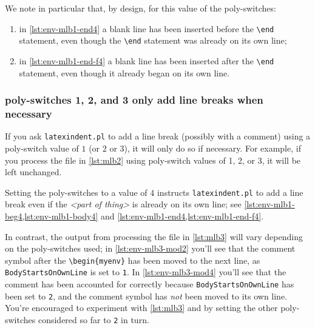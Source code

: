	We note in particular that, by design, for this value of the poly-switches:
	\begin{enumerate}
		\item in \cref{lst:env-mlb1-end4} a blank line has been inserted before the
		      \lstinline!\end! statement, even though the \lstinline!\end!
		      statement was already on its own line;
		\item in \cref{lst:env-mlb1-end-f4} a blank line has been inserted after the
		      \lstinline!\end! statement, even though it already began on its own line.
	\end{enumerate}

\subsubsection{poly-switches 1, 2, and 3 only add line breaks when necessary}
	If you ask \texttt{latexindent.pl} to add a line break (possibly with a comment)
	using a poly-switch value of $1$ (or $2$
	or $3$), it will only do so if necessary. For example, if you
	process the file in \vref{lst:mlb2} using poly-switch values of 1, 2, or 3,
	it will be left unchanged.

	\begin{minipage}{.45\linewidth}
	\end{minipage}
	\hfill
	\begin{minipage}{.45\linewidth}
	\end{minipage}

	Setting the poly-switches to a value of $4$ instructs
	\texttt{latexindent.pl} to add a line break even if the \emph{<part of thing>}
	is already on its own line; see \cref{lst:env-mlb1-beg4,lst:env-mlb1-body4} and
	\cref{lst:env-mlb1-end4,lst:env-mlb1-end-f4}.

	In contrast, the output from processing the file in \cref{lst:mlb3} will
	vary depending on the poly-switches used; in \cref{lst:env-mlb3-mod2} you'll see that
	the comment symbol after the \lstinline!\begin{myenv}! has been moved to the next line,
	as \texttt{BodyStartsOnOwnLine} is set to \texttt{1}. In
	\cref{lst:env-mlb3-mod4} you'll see that the comment has been accounted for correctly
	because \texttt{BodyStartsOnOwnLine} has been set to \texttt{2}, and
	the comment symbol has \emph{not} been moved to its own line. You're
	encouraged to experiment with \cref{lst:mlb3} and by setting the other
	poly-switches considered so far to \texttt{2} in turn.

